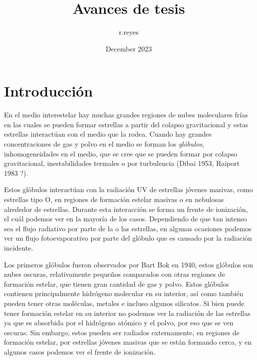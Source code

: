 \documentclass{book}
\title{Avances de tesis}
\author{r.reyes }
\date{December 2023}
\begin{document}
\maketitle

\tableofcontents

\newpage

\chapter{Introducción}

En el medio interestelar hay muchas grandes regiones de nubes moleculares frías en las cuales se pueden formar estrellas a partir del colapso gravitacional y estas estrellas interactúan con el medio que la rodea. Cuando hay grandes concentraciones de gas y polvo en el medio se forman los \textit{glóbulos}, inhomogeneidades en el medio, que se cree que se pueden formar por colapso gravitacional, inestabilidades termales o por turbulencia (Dibai 1953, Raiport 1983 ?). 

Estos glóbulos interactúan con la radiación UV de estrellas jóvenes masivas, como estrellas tipo O, en regiones de formación estelar masivas o en nebulosas alrededor de estrellas. Durante esta interacción se forma un frente de ionización, el cuál podemos ver en la mayoría de los casos. Dependiendo de que tan intenso sea el flujo radiativo por parte de la o las estrellas, en algunas ocasiones podemos ver un flujo fotoevaporativo por parte del glóbulo que es causado por la radiación incidente.

Los primeros glóbulos fueron observados por Bart Bok en 1940, estos glóbulos son nubes oscuras, relativamente pequeños comparados con otras regiones de formación estelar, que tienen gran cantidad de gas y polvo. Estos glóbulos contienen principalmente hidrógeno molecular en su interior, así como también pueden tener otras moléculas, metales e incluso algunos silicatos. Si bien puede tener formación estelar en su interior no podemos ver la radiación de las estrellas ya que es absorbida por el hidrógeno atómico y el polvo, por eso que se ven oscuras. Sin embargo, estos pueden ser radiados externamente, en regiones de formación estelar, por estrellas jóvenes masivas que se están formando cerca, y en algunos casos podemos ver el frente de ionización.
\end{document}
